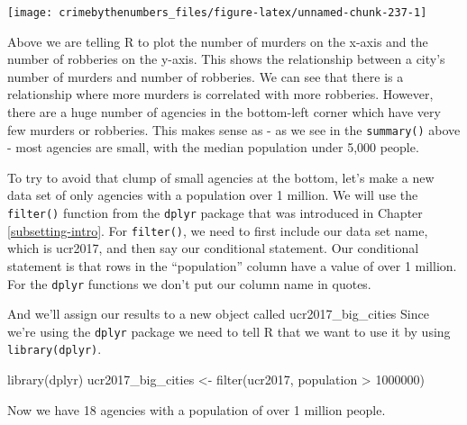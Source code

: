 \documentclass[
]{krantz}
\makeatletter
\newenvironment{Shaded}{\begin{snugshade}}{\end{snugshade}}
\newcommand{\DecValTok}[1]{\textcolor[rgb]{0.06,0.06,0.06}{#1}}
\newcommand{\FunctionTok}[1]{\textcolor[rgb]{0,0,0}{#1}}
\newcommand{\NormalTok}[1]{#1}
\newcommand{\OtherTok}[1]{\textcolor[rgb]{0.37,0.37,0.37}{#1}}
\newcommand{\SpecialCharTok}[1]{\textcolor[rgb]{0,0,0}{#1}}
\newenvironment{kframe}{%
\medskip{}
\setlength{\fboxsep}{.8em}
 \def\at@end@of@kframe{}%
 \ifinner\ifhmode%
  \def\at@end@of@kframe{\end{minipage}}%
  \begin{minipage}{\columnwidth}%
 \fi\fi%
 \def\FrameCommand##1{\hskip\@totalleftmargin \hskip-\fboxsep
 \colorbox{shadecolor}{##1}\hskip-\fboxsep
     \hskip-\linewidth \hskip-\@totalleftmargin \hskip\columnwidth}%
 \MakeFramed {\advance\hsize-\width
   \@totalleftmargin\z@ \linewidth\hsize
   \@setminipage}}%
 {\par\unskip\endMakeFramed%
 \at@end@of@kframe}
\renewenvironment{Shaded}{\begin{kframe}}{\end{kframe}}
\makeatother
\begin{document}
\begin{Shaded}
\end{Shaded}

\begin{center}\texttt{[image: crimebythenumbers\_files/figure-latex/unnamed-chunk-237-1]} \end{center}

Above we are telling R to plot the number of murders on the
x-axis and the number of robberies on the y-axis. This shows
the relationship between a city's number of murders and
number of robberies. We can see that there is a relationship
where more murders is correlated with more robberies.
However, there are a huge number of agencies in the
bottom-left corner which have very few murders or robberies.
This makes sense as - as we see in the \texttt{summary()}
above - most agencies are small, with the median population
under 5,000 people.

To try to avoid that clump of small agencies at the bottom,
let's make a new data set of only agencies with a population
over 1 million. We will use the \texttt{filter()} function
from the \texttt{dplyr} package that was introduced in
Chapter \ref{subsetting-intro}. For \texttt{filter()}, we
need to first include our data set name, which is ucr2017,
and then say our conditional statement. Our conditional
statement is that rows in the ``population'' column have a
value of over 1 million. For the \texttt{dplyr} functions we
don't put our column name in quotes.

And we'll assign our results to a new object called
ucr2017\_big\_cities Since we're using the \texttt{dplyr}
package we need to tell R that we want to use it by using
\texttt{library(dplyr)}.

\begin{Shaded}
\begin{Highlighting}[]
\FunctionTok{library}\NormalTok{(dplyr)}
\NormalTok{ucr2017\_big\_cities }\OtherTok{\textless{}{-}} \FunctionTok{filter}\NormalTok{(ucr2017, population }\SpecialCharTok{\textgreater{}} \DecValTok{1000000}\NormalTok{)}
\end{Highlighting}
\end{Shaded}

Now we have 18 agencies with a population of over 1 million
people.
\end{document}
